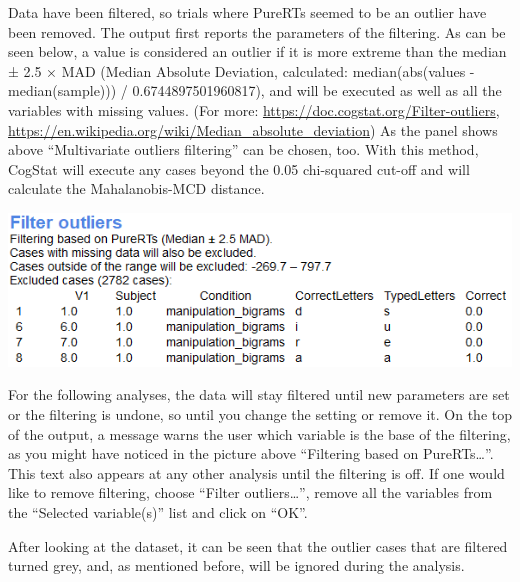 \documentclass[
]{book}
\begin{document}
Data have been filtered, so trials where PureRTs seemed to be an outlier have been removed. The output first reports the parameters of the filtering. As can be seen below, a value is considered an outlier if it is more extreme than the median ± 2.5 × MAD (Median Absolute Deviation, calculated: median(abs(values - median(sample))) / 0.6744897501960817), and will be executed as well as all the variables with missing values. (For more: \url{https://doc.cogstat.org/Filter-outliers}, \url{https://en.wikipedia.org/wiki/Median_absolute_deviation}) As the panel shows above ``Multivariate outliers filtering'' can be chosen, too. With this method, CogStat will execute any cases beyond the 0.05 chi-squared cut-off and will calculate the Mahalanobis-MCD distance.

\includegraphics{img/ch9/9.3filteroutliers_raw.png}

For the following analyses, the data will stay filtered until new parameters are set or the filtering is undone, so until you change the setting or remove it. On the top of the output, a message warns the user which variable is the base of the filtering, as you might have noticed in the picture above ``Filtering based on PureRTs\ldots{}''. This text also appears at any other analysis until the filtering is off. If one would like to remove filtering, choose ``Filter outliers\ldots{}'', remove all the variables from the ``Selected variable(s)'' list and click on ``OK''.

After looking at the dataset, it can be seen that the outlier cases that are filtered turned grey, and, as mentioned before, will be ignored during the analysis.
\end{document}
